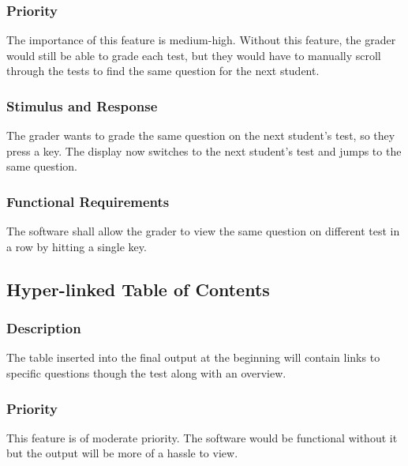 \subsubsection{Priority}
The importance of this feature is medium-high. Without this feature, the grader would still be able to grade each test, but they would have to manually scroll through the tests to find the same question for the next student.

\subsubsection{Stimulus and Response}
The grader wants to grade the same question on the next student's test, so they press a key. The display now switches to the next student's test and jumps to the same question.

\subsubsection{Functional Requirements}
The software shall allow the grader to view the same question on different test in a row by hitting a single key.


\subsection{Hyper-linked Table of Contents}
\subsubsection{Description}
The table inserted into the final output at the beginning will contain links to specific questions though the test along with an overview.

\subsubsection{Priority}
This feature is of moderate priority. The software would be functional without it but the output will be more of a hassle to view.

